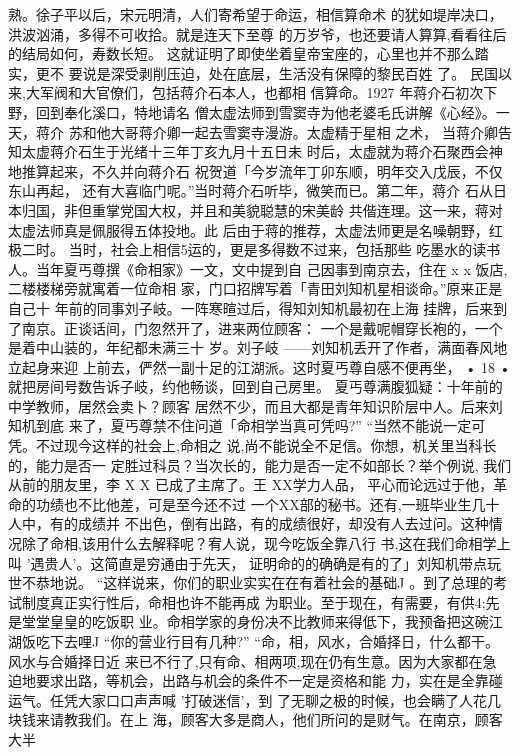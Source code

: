 熟。徐子平以后，宋元明清，人们寄希望于命运，相信算命术
的犹如堤岸决口，洪波汹涌，多得不可收拾。就是连天下至尊
的万岁爷，也还要请人算算,看看往后的结局如何，寿数长短。
这就证明了即使坐着皇帝宝座的，心里也并不那么踏实，更不
要说是深受剥削压迫，处在底层，生活没有保障的黎民百姓
了。
民国以来,大军阀和大官僚们，包括蒋介石本人，也都相
信算命。1927 年蒋介石初次下野，回到奉化溪口，特地请名
僧太虚法师到雪窦寺为他老婆毛氏讲解《心经》。一天，蒋介
苏和他大哥蒋介卿一起去雪窦寺漫游。太虚精于星相 之术，
当蒋介卿告知太虚蒋介石生于光绪十三年丁亥九月十五日未
时后，太虚就为蒋介石聚西会神地推算起来，不久并向蒋介石
祝贺道「今岁流年丁卯东顺，明年交入戊辰，不仅东山再起，
还有大喜临门呢。”当时蒋介石听毕，微笑而已。第二年，蒋介
石从日本归国，非但重掌党国大权，并且和美貌聪慧的宋美龄
共偕连理。这一来，蒋对太虚法师真是佩服得五体投地。此
后由于蒋的推荐，太虚法师更是名噪朝野，红极二时。
当时，社会上相信5运的，更是多得数不过来，包括那些
吃墨水的读书人。当年夏丐尊撰《命相家》一文，文中提到自
己因事到南京去，住在 x x 饭店,二楼楼梯旁就寓着一位命相
家，门口招牌写着「青田刘知机星相谈命。”原来正是自己十
年前的同事刘子岐。一阵寒暄过后，得知刘知机最初在上海
挂牌，后来到了南京。正谈话间，门忽然开了，进来两位顾客：
一个是戴呢帽穿长袍的，一个是着中山装的，年纪都未满三十
岁。刘子岐
——刘知机丢开了作者，满面春风地立起身来迎
上前去，俨然一副十足的江湖派。这时夏丐尊自感不便再坐，
• 18 •
就把房间号数告诉子岐，约他畅谈，回到自己房里。
夏丐尊满腹狐疑：十年前的中学教师，居然会卖卜？顾客
居然不少，而且大都是青年知识阶层中人。后来刘知机到底
来了，夏丐尊禁不住问道「命相学当真可凭吗?”
“当然不能说一定可凭。不过现今这样的社会上,命相之
说,尚不能说全不足信。你想，机关里当科长的，能力是否一
定胜过科员？当次长的，能力是否一定不如部长？举个例说,
我们从前的朋友里，李 X X 已成了主席了。王 XX学力人品，
平心而论远过于他，革命的功绩也不比他差，可是至今还不过
一个XX部的秘书。还有,一班毕业生几十人中，有的成绩并
不出色，倒有出路，有的成绩很好，却没有人去过问。这种情
况除了命相,该用什么去解释呢？宥人说，现今吃饭全靠八行
书,这在我们命相学上叫 '遇贵人'。这简直是穷通由于先天，
证明命的的确确是有的了」刘知机带点玩世不恭地说。
“这样说来，你们的职业实实在在有着社会的基础J
。到了总理的考试制度真正实行性后，命相也许不能再成
为职业。至于现在，有需要，有供4;先是堂堂皇皇的吃饭职
业。命相学家的身份决不比教师来得低下，我预备把这碗江
湖饭吃下去哩J
“你的营业行目有几种?”
“命，相，风水，合婚择日，什么都干。风水与合婚择日近
来已不行了,只有命、相两项,现在仍有生意。因为大家都在急
迫地要求出路，等机会，出路与机会的条件不一定是资格和能
力，实在是全靠碰运气。任凭大家口口声声喊 '打破迷信'，到
了无聊之极的时候，也会瞒了人花几块钱来请教我们。在上
海，顾客大多是商人，他们所问的是财气。在南京，顾客大半
